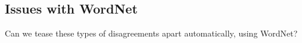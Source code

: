 \documentclass[11pt,a4paper]{article}
\begin{document}
\subsection{Issues with WordNet}



Can we tease these types of disagreements apart automatically, using WordNet?
\end{document}
